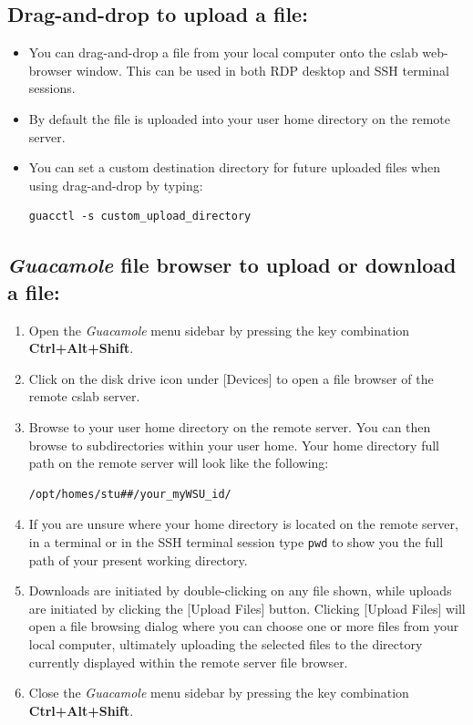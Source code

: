 \documentclass[12pt]{article}
\begin{document}
\subsection*{Drag-and-drop to upload a file:}
\begin{itemize}
\item You can drag-and-drop a file from your local computer onto the cslab web-browser window. This can be used in both RDP desktop and SSH terminal sessions.
\item By default the file is uploaded into your user home directory on the remote server.
\item You can set a custom destination directory for future uploaded files when using drag-and-drop by typing:
\begin{verbatim}
guacctl -s custom_upload_directory
\end{verbatim}
\end{itemize}

\subsection*{\textit{Guacamole} file browser to upload or download a file:}
\begin{enumerate}
\item Open the \textit{Guacamole} menu sidebar by pressing the key combination \textbf{Ctrl+Alt+Shift}.
\item Click on the disk drive icon under [Devices] to open a file browser of the remote cslab server.
\item Browse to your user home directory on the remote server. You can then browse to subdirectories within your user home. Your home directory full path on the remote server will look like the following:
\begin{verbatim}
/opt/homes/stu##/your_myWSU_id/
\end{verbatim}
\item If you are unsure where your home directory is located on the remote server, in a terminal or in the SSH terminal session type \texttt{pwd} to show you the full path of your present working directory.
\item Downloads are initiated by double-clicking on any file shown, while uploads are initiated by clicking the [Upload Files] button. Clicking [Upload Files] will open a file browsing dialog where you can choose one or more files from your local computer, ultimately uploading the selected files to the directory currently displayed within the remote server file browser.
\item Close the \textit{Guacamole} menu sidebar by pressing the key combination \textbf{Ctrl+Alt+Shift}.
\end{enumerate}
\end{document}
